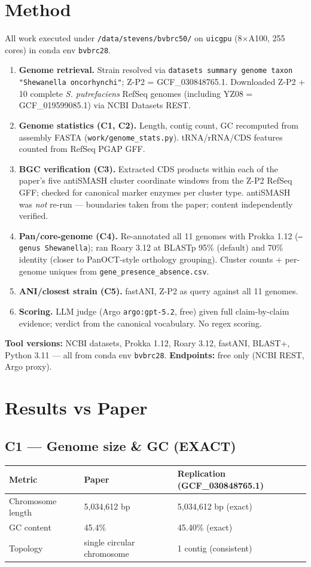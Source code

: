 \documentclass[11pt]{article}
\begin{document}
\section{Method}
All work executed under \texttt{/data/stevens/bvbrc50/} on \texttt{uicgpu} (8$\times$A100, 255 cores) in conda env \texttt{bvbrc28}.
\begin{enumerate}[leftmargin=*]
  \item \textbf{Genome retrieval.} Strain resolved via \texttt{datasets summary genome taxon "Shewanella oncorhynchi"}; Z-P2 = GCF\_030848765.1. Downloaded Z-P2 + 10 complete \emph{S. putrefaciens} RefSeq genomes (including YZ08 = GCF\_019599085.1) via NCBI Datasets REST.
  \item \textbf{Genome statistics (C1, C2).} Length, contig count, GC recomputed from assembly FASTA (\texttt{work/genome\_stats.py}). tRNA/rRNA/CDS features counted from RefSeq PGAP GFF.
  \item \textbf{BGC verification (C3).} Extracted CDS products within each of the paper's five antiSMASH cluster coordinate windows from the Z-P2 RefSeq GFF; checked for canonical marker enzymes per cluster type. antiSMASH was \emph{not} re-run --- boundaries taken from the paper; content independently verified.
  \item \textbf{Pan/core-genome (C4).} Re-annotated all 11 genomes with Prokka 1.12 (\texttt{--genus Shewanella}); ran Roary 3.12 at BLASTp 95\% (default) and 70\% identity (closer to PanOCT-style orthology grouping). Cluster counts + per-genome uniques from \texttt{gene\_presence\_absence.csv}.
  \item \textbf{ANI/closest strain (C5).} fastANI, Z-P2 as query against all 11 genomes.
  \item \textbf{Scoring.} LLM judge (Argo \texttt{argo:gpt-5.2}, free) given full claim-by-claim evidence; verdict from the canonical vocabulary. No regex scoring.
\end{enumerate}
\textbf{Tool versions:} NCBI datasets, Prokka 1.12, Roary 3.12, fastANI, BLAST+, Python 3.11 --- all from conda env \texttt{bvbrc28}. \textbf{Endpoints:} free only (NCBI REST, Argo proxy).

\section{Results vs Paper}

\subsection{C1 --- Genome size \& GC (EXACT)}
\begin{tabular}{@{}lll@{}}
\toprule
Metric & Paper & Replication (GCF\_030848765.1) \\ \midrule
Chromosome length & 5{,}034{,}612 bp & 5{,}034{,}612 bp (exact) \\
GC content & 45.4\% & 45.40\% (exact) \\
Topology & single circular chromosome & 1 contig (consistent) \\
\bottomrule
\end{tabular}
\end{document}
